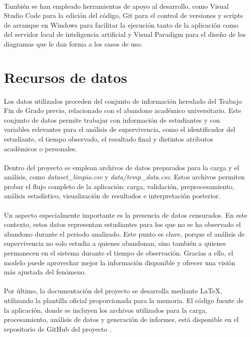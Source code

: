 \paragraph*{}También se han empleado herramientas de apoyo al desarrollo, como Visual Studio Code para la edición del código, Git para el control de versiones y scripts de arranque en Windows para facilitar la ejecución tanto de la aplicación como del servidor local de inteligencia artificial y Visual Paradigm para el diseño de los diagramas que le dan forma a los casos de uso.

\section{Recursos de datos}
\paragraph*{}Los datos utilizados proceden del conjunto de información heredado del Trabajo Fin de Grado previo, relacionado con el abandono académico universitario. Este conjunto de datos permite trabajar con información de estudiantes y con variables relevantes para el análisis de supervivencia, como el identificador del estudiante, el tiempo observado, el resultado final y distintos atributos académicos o personales.

\paragraph*{}Dentro del proyecto se emplean archivos de datos preparados para la carga y el análisis, como \textit{dataset\_limpio.csv} y \textit{data/temp\_data.csv}. Estos archivos permiten probar el flujo completo de la aplicación: carga, validación, preprocesamiento, análisis estadístico, visualización de resultados e interpretación posterior.

\paragraph*{}Un aspecto especialmente importante es la presencia de datos censurados. En este contexto, estos datos representan estudiantes para los que no se ha observado el abandono durante el periodo analizado. Este punto es clave, porque el análisis de supervivencia no solo estudia a quienes abandonan, sino también a quienes permanecen en el sistema durante el tiempo de observación. Gracias a ello, el modelo puede aprovechar mejor la información disponible y ofrecer una visión más ajustada del fenómeno.

\paragraph*{}Por último, la documentación del proyecto se desarrolla mediante \LaTeX, utilizando la plantilla oficial proporcionada para la memoria. El código fuente de la aplicación, donde se incluyen los archivos utilizados para la carga, procesamiento, análisis de datos y generación de informes, está disponible en el repositorio de GitHub del proyecto \cite{github_tfg_alfonso}.
